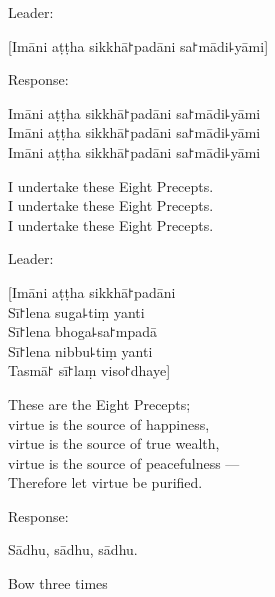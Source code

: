 \begin{instruction}
  Leader:
\end{instruction}

[Imāni aṭṭha sikkhā꜓padāni sa꜓mādi꜕yāmi]

\begin{instruction}
  Response:
\end{instruction}

Imāni aṭṭha sikkhā꜓padāni sa꜓mādi꜕yāmi\\
Imāni aṭṭha sikkhā꜓padāni sa꜓mādi꜕yāmi\\
Imāni aṭṭha sikkhā꜓padāni sa꜓mādi꜕yāmi

\begin{english}
  I undertake these Eight Precepts.\\
  I undertake these Eight Precepts.\\
  I undertake these Eight Precepts.
\end{english}

\begin{instruction}
  Leader:
\end{instruction}

[Imāni aṭṭha sikkhā꜓padāni\\
Sī꜓lena suga꜕tiṃ yanti\\
Sī꜓lena bhoga꜕sa꜓mpadā\\
Sī꜓lena nibbu꜕tiṃ yanti\\
Tasmā꜓ sī꜓laṃ viso꜓dhaye]

\begin{english}
  These are the Eight Precepts;\\
  virtue is the source of happiness,\\
  virtue is the source of true wealth,\\
  virtue is the source of peacefulness ---\\
  Therefore let virtue be purified.
\end{english}

\begin{instruction}
  Response:
\end{instruction}

Sādhu, sādhu, sādhu.

\begin{instruction}
  Bow three times
\end{instruction}

